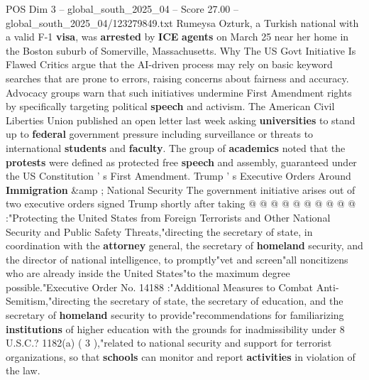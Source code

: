 \begin{textsample}{POS Dim 3 – global\_south\_2025\_04 – Score 27.00 – global\_south\_2025\_04/123279849.txt}
Rumeysa Ozturk, a Turkish national with a valid F-1 \textbf{visa}, was \textbf{arrested} by \textbf{ICE} \textbf{agents} on March 25 near her home in the Boston suburb of Somerville, Massachusetts.
Why The US Govt Initiative Is Flawed Critics argue that the AI-driven process may rely on basic keyword searches that are prone to errors, raising concerns about fairness and accuracy.
Advocacy groups warn that such initiatives undermine First Amendment rights by specifically targeting political \textbf{speech} and activism.
The American Civil Liberties Union published an open letter last week asking \textbf{universities} to stand up to \textbf{federal} government pressure including surveillance or threats to international \textbf{students} and \textbf{faculty}.
The group of \textbf{academics} noted that the \textbf{protests} were defined as protected free \textbf{speech} and assembly, guaranteed under the US Constitution ' s First Amendment.
Trump ' s Executive Orders Around \textbf{Immigration} \&amp ; National Security The government initiative arises out of two executive orders signed Trump shortly after taking @ @ @ @ @ @ @ @ @ @ :"Protecting the United States from Foreign Terrorists and Other National Security and Public Safety Threats,"directing the secretary of state, in coordination with the \textbf{attorney} general, the secretary of \textbf{homeland} security, and the director of national intelligence, to promptly"vet and screen"all noncitizens who are already inside the United States"to the maximum degree possible."Executive Order No. 14188 :"Additional Measures to Combat Anti-Semitism,"directing the secretary of state, the secretary of education, and the secretary of \textbf{homeland} security to provide"recommendations for familiarizing \textbf{institutions} of higher education with the grounds for inadmissibility under 8 U.S.C.? 1182(a) ( 3 ),"related to national security and support for terrorist organizations, so that \textbf{schools} can monitor and report \textbf{activities} in violation of the law.

\end{textsample}
